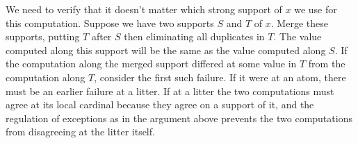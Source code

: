 \documentclass{slides}
\begin{document}
\begin{slide}

We need to verify that it doesn't matter which strong support of $x$ we use for this computation.  Suppose we have two supports $S$ and $T$ of $x$.  Merge these supports,
putting $T$ after $S$ then eliminating all duplicates in $T$.  The value computed along this support will be the same as the value computed along $S$.  If the computation along the merged support differed at some value in $T$ from the computation along $T$, consider the first such failure.  If it were at an atom, there must be an earlier failure at a litter.
If at a litter the two computations must agree at its local cardinal because they agree on a support of it, and the regulation of exceptions as in the argument above
prevents the two computations from disagreeing at the litter itself.

\end{slide}
\end{document}

